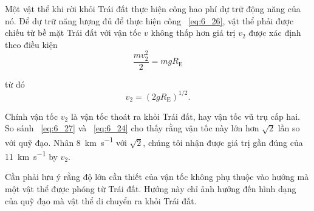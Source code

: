 Một vật thể khi rời khỏi Trái đất thực hiện công hao phí dự trữ động năng của nó. Để dự trữ năng lượng  đủ để thực hiện công  ~\eqref{eq:6_26}, vật thể phải được chiếu từ bề mặt Trái đất với vận tốc $v$ không thấp hơn giá trị $v_2$ được xác định theo điều kiện
\begin{equation*}
	\frac{mv_2^2}{2} = mgR_{\text{E}}
\end{equation*}

\noindent
từ đó
\begin{equation}\label{eq:6_27}
	v_2 = (2gR_{\text{E}})^{1/2}.
\end{equation}

\noindent
Chính vận tốc $v_2$ là vận tốc thoát ra khỏi Trái đất, hay vận tốc vũ trụ cấp hai. So sánh ~\eqref{eq:6_27} và ~\eqref{eq:6_24} cho thấy rằng vận tốc này lớn hơn $\sqrt{2}$ lần so với quỹ đạo. Nhân \SI{8}{\kilo\metre\per\second} với  $\sqrt{2}$, chúng tôi nhận được giá trị gần đúng của \SI{11}{\kilo\metre\per\second} by $v_2$.

Cần phải lưu ý rằng độ lớn cần thiết của vận tốc không phụ thuộc vào hướng mà một vật thể được phóng từ Trái đất. Hướng này chỉ ảnh hưởng đến hình dạng của quỹ đạo mà vật thể di chuyển ra khỏi Trái đất.


